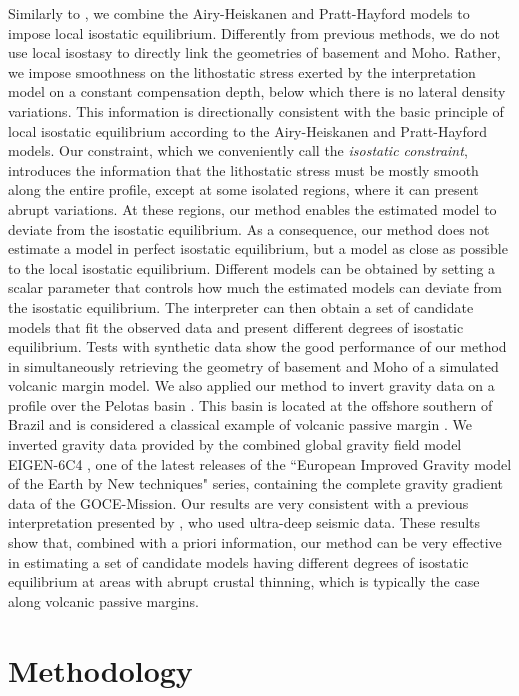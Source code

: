 \documentclass[manuscript]{geophysics}
\begin{document}
Similarly to \citet{ferderer-etal2017}, we combine the Airy-Heiskanen and Pratt-Hayford
models to impose local isostatic equilibrium.
Differently from previous methods, we do not use local isostasy to directly link
the geometries of basement and Moho.
Rather, we impose smoothness on the lithostatic stress exerted by the interpretation 
model on a constant compensation depth, below which there is no lateral density variations.
This information is directionally consistent with the basic principle of 
local isostatic equilibrium according to the Airy-Heiskanen and Pratt-Hayford models.
Our constraint, which we conveniently call the \textit{isostatic constraint},
introduces the information that the lithostatic stress must be mostly smooth along the 
entire profile, except at some isolated regions, where it can present abrupt variations.
At these regions, our method enables the estimated model to deviate from the 
isostatic equilibrium.
As a consequence, our method does not estimate a model in perfect isostatic equilibrium, 
but a model as close as possible to the local isostatic equilibrium. 
Different models can be obtained by setting a scalar parameter that controls 
how much the estimated models can deviate from the isostatic equilibrium.
The interpreter can then obtain a set of candidate models that fit the observed data
and present different degrees of isostatic equilibrium.
Tests with synthetic data show the good performance of our method in simultaneously
retrieving the geometry of basement and Moho of a simulated volcanic margin
model. We also applied our method to invert 
gravity data on a profile over the Pelotas basin \citep{stica-etal2014}. This basin is
located at the offshore southern of Brazil and is considered a classical example 
of volcanic passive margin \citep{geoffroy2005}. 
We inverted gravity data provided by the combined global gravity field model EIGEN-6C4
\citep{forste2014}, one of the latest releases of the ``European Improved Gravity model of 
the Earth by New techniques" series, containing the complete gravity gradient data of the 
GOCE-Mission.
Our results are very consistent with a previous
interpretation presented by \citet{zalan2015}, who used ultra-deep seismic data.
These results show that, combined with a priori information, our method can be very effective in 
estimating a set of candidate models having different degrees of isostatic equilibrium at
areas with abrupt crustal thinning, which is typically the case along volcanic passive margins.


\section{Methodology}
\end{document}
